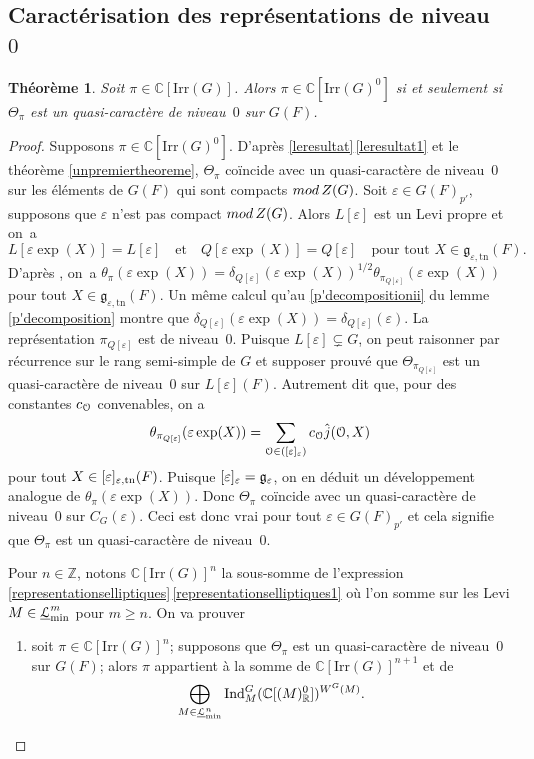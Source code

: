 \documentclass[11pt]{article}
\newcommand{\Subsection}{\subsection}
\numberwithin{equation}{section}\providecommand{\og}{«\,}\providecommand{\fg}{\,»}
\let\mathcal \EuScript
\newcommand{\NoChangel}[1]{%
\expandafter\let\csname old\string#1\endcsname=#1
\let#1=\relax
\newcommand{#1}{\mathcode`l="716C\csname old\string#1\endcsname\mathcode`l="7160 }%
}
\let\epsilon\varepsilon
\newcommand{\quadet}{\quad\text{et}\quad}
\newcommand{\rmod}{\textup{mod}\,}
\newcommand{\frg}{\mathfrak{g}}
\newcommand{\frl}{\mathfrak{l}}\NoChangel{\frl}
\newcommand{\Ell}{\mathrm{Ell}} \NoChangel{\Ell}
\newcommand{\Ind}{\mathrm{Ind}}
\newcommand{\Irr}{\mathrm{Irr}}
\newcommand{\Nil}{\mathrm{Nil}} \NoChangel{\Nil}
\newcommand{\tn}{\mathrm{tn}}
\newcommand{\cL}{\mathcal{L}}
\newcommand{\cO}{\mathcal{O}}
\newcommand{\CC}{\mathbb{C}}
\newcommand{\ZZ}{\mathbb{Z}}
\newcommand{\RR}{\mathbb{R}}
\theoremstyle{plain}
\newtheorem*{thm*}{Théorème}
\theoremstyle{definition}
\begin{document}
\Subsection{Caractérisation des représentations de niveau~\texorpdfstring{$0$}{0}}\label{caracterisation}

\begin{thm*}
Soit $\pi\in \CC[\Irr(G)]$. Alors $\pi\in \CC[\Irr(G)^0]$ si et seulement si $\Theta_{\pi}$ est un quasi-caractère de niveau~$0$ sur $G(F)$.
\end{thm*}

\begin{proof}
Supposons $\pi\in \CC[\Irr(G)^0]$. D'après \ref{leresultat}\,\eqref{leresultat1} et le théorème \ref{unpremiertheoreme}, $\Theta_{\pi}$ coïncide avec un quasi-caractère de niveau~$0$ sur les éléments de $G(F)$ qui sont compacts $\rmod Z(G)$. Soit $\epsilon\in G(F)_{p'}$, supposons que $\epsilon$ n'est pas compact $\rmod Z(G)$. Alors $L[\epsilon]$ est un Levi propre et on~a
\[
L[\epsilon \exp(X)]=L[\epsilon]\quadet Q[\epsilon \exp(X)]=Q[\epsilon]\quad \text{pour tout }X\in \frg_{\epsilon,\tn}(F).
\]
D'après \cite[Th.\,5.2]{C}, on~a $\theta_{\pi}(\epsilon \exp(X))=\delta_{Q[\epsilon]}(\epsilon \exp(X))^{1/2}\theta_{\pi_{Q[\epsilon]}}(\epsilon \exp(X))$ pour tout $X\in \frg_{\epsilon,\tn}(F)$. Un même calcul qu'au \eqref{p'decompositionii} du lemme \ref{p'decomposition} montre que $\delta_{Q[\epsilon]}(\epsilon \exp(X))=\delta_{Q[\epsilon]}(\epsilon)$. La représentation $\pi_{Q[\epsilon]}$ est de niveau~$0$. Puisque $L[\epsilon]\subsetneq G$, on peut raisonner par récurrence sur le rang semi-simple de $G$ et supposer prouvé que $\Theta_{\pi_{Q[\epsilon]}}$ est un quasi-caractère de niveau~$0$ sur $L[\epsilon](F)$. Autrement dit que, pour des constantes $c_{\cO}$ convenables, on a
\[
\theta_{\pi_{Q[\epsilon]}}(\epsilon \exp(X))=\sum_{\cO\in \Nil(\frl[\epsilon]_{\epsilon})}c_{\cO}\hat{j}(\cO,X)
\]
pour tout $X\in \frl[\epsilon]_{\epsilon,\tn}(F)$. Puisque $\frl[\epsilon]_{\epsilon}=\frg_{\epsilon}$, on en déduit un développement analogue de $\theta_{\pi}(\epsilon \exp(X))$. Donc $\Theta_{\pi}$ coïncide avec un quasi-caractère de niveau~$0$ sur $C_{G}(\epsilon)$. Ceci est donc vrai pour tout $\epsilon\in G(F)_{p'}$ et cela signifie que $\Theta_{\pi}$ est un quasi-caractère de niveau~$0$.

Pour $n\in \ZZ$, notons $\CC[\Irr(G)]^n$ la sous-somme de l'expression \ref{representationselliptiques}\,\eqref{representationselliptiques1} où l'on somme sur les Levi $M\in \underline{\cL}^m_{\min}$ pour $m\geq n$. On va prouver
\begin{enumerate}
\item\label{caracterisation1}
soit $\pi\in \CC[\Irr(G)]^n$; supposons que $\Theta_{\pi}$ est un quasi-caractère de niveau~$0$ sur $G(F)$; alors $\pi$ appartient à la somme de $\CC[\Irr(G)]^{n+1}$ et de
\[
\bigoplus_{M\in \underline{\cL}^n_{\min}}\Ind_{M}^G(\CC[\Ell(M)_{\RR}^0])^{W^G(M)}.
\]
\end{enumerate}


\end{proof}
\end{document}
